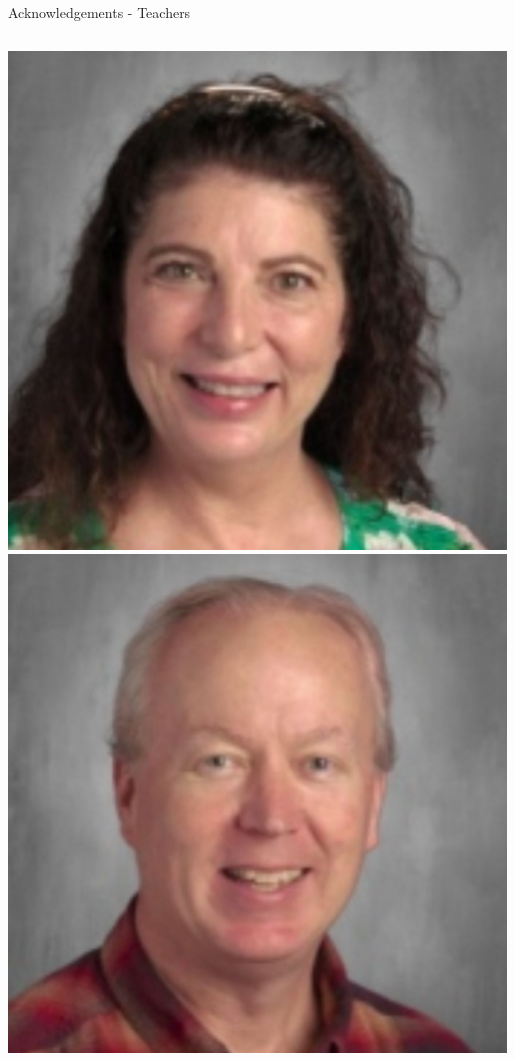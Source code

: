 \documentclass[aspectratio=169]{beamer}
\begin{document}
\begin{frame}{Acknowledgements - Teachers}
\begin{columns}
            \centering
            \includegraphics[width=0.99\textwidth]{people/teachers/messina.png}
            \includegraphics[width=0.99\textwidth]{people/teachers/noon.png}


\end{columns}
\end{frame}
\end{document}
